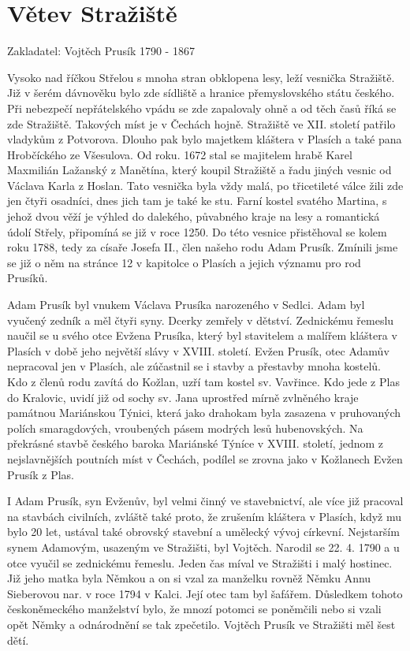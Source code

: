 \documentclass[../dejiny-rodu-prusiku.tex]{subfiles}
\begin{document}
\chapter{Větev Stražiště}

Zakladatel: Vojtěch Prusík 1790 - 1867

Vysoko nad říčkou Střelou s mnoha stran obklopena lesy, leží vesnička Stražiště. Již v šerém dávnověku bylo zde sídliště a hranice přemyslovského státu českého. Při nebezpečí nepřátelského vpádu se zde zapalovaly ohně a od těch časů říká se zde Stražiště. Takových míst je v Čechách hojně. Stražiště ve XII. století patřilo vladykům z Potvorova. Dlouho pak bylo majetkem kláštera v Plasích a také pana Hrobčíckého ze Všesulova. Od roku. 1672 stal se majitelem hrabě Karel Maxmilián Lažanský z Manětína, který koupil Stražiště a řadu jiných vesnic od Václava Karla z Hoslan. Tato vesnička byla vždy malá, po třicetileté válce žili zde jen čtyři osad­níci, dnes jich tam je také ke stu. Farní kostel svatého Martina, s jehož dvou věží je výhled do dalekého, půvabného kraje na lesy a romantická údolí Střely, připomíná se již v roce 1250. Do této vesnice přistěhoval se kolem roku 1788, tedy za císaře Josefa II., člen našeho rodu Adam Prusík. Zmínili jsme se již o něm na strán­ce 12 v kapitolce o Plasích a jejich významu pro rod Prusíků.

Adam Prusík byl vnukem Václava Prusíka narozeného v Sedlci. Adam byl vyučený zedník a měl čtyři syny. Dcerky zemřely v dětství. Zednickému řemeslu naučil se u své­ho otce Evžena Prusíka, který byl stavitelem a malířem kláštera v Plasích v době jeho největší slávy v XVIII. století. Evžen Prusík, otec Adamův nepracoval jen v Plasích, ale zúčastnil se i stavby a přestavby mnoha kostelů. Kdo z členů rodu zavítá do Kožlan, uzří tam kostel sv. Vavřince. Kdo jede z Plas do Kralovic, uvidí již od sochy sv. Jana uprostřed mírně zvlněného kraje památnou Mariánskou Týnici, která jako drahokam byla zasazena v pruhovaných polích smaragdových, vroubených pásem modrých lesů hubenovských. Na překrásné stavbě českého baroka Mariánské Týníce v XVIII. století, jednom z nejslavnějších poutních míst v Čechách, podílel se zrovna jako v Kožlanech Evžen Prusík z Plas.

I Adam Prusík, syn Evženův, byl velmi činný ve stavebnictví, ale více již pracoval na stavbách civilních, zvláště také proto, že zrušením kláštera v Plasích, když mu bylo 20 let, ustával také obrovský stavební a umělecký vývoj církevní. Nejstarším synem Adamovým, usazeným ve Stražišti, byl Vojtěch. Narodil se 22. 4. 1790 a u otce vyučil se zednickému řemeslu. Jeden čas míval ve Stražišti i malý hostinec. Již jeho matka byla Němkou a on si vzal za manželku rovněž Němku Annu Sieberovou nar. v roce 1794 v Kalci.  Její otec tam byl šafářem. Důsledkem tohoto českoněmeckého manželství bylo, že mnozí potomci se poněmčili nebo si vzali opět Němky a odnárodnění se tak zpečetilo. Vojtěch Prusík ve Stražišti měl šest dětí.
\end{document}
